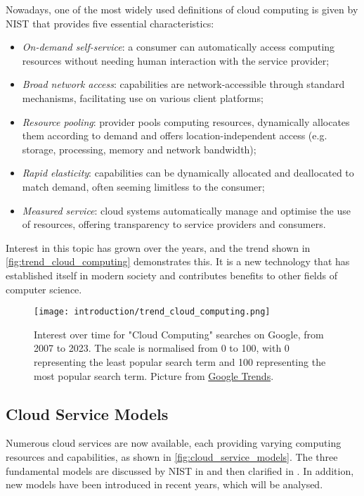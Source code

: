 \documentclass[../thesis.tex]{subfiles}
\begin{document}
Nowadays, one of the most widely used definitions of cloud computing is given by \acrshort{NIST} \cite{article:nist_cloud_computing_2011} that provides five essential characteristics:
\begin{itemize}
    \item \textit{On-demand self-service}: a consumer can automatically access computing resources without needing human interaction with the service provider;
    \item \textit{Broad network access}: capabilities are network-accessible through standard mechanisms, facilitating use on various client platforms;
    \item \textit{Resource pooling}: provider pools computing resources, dynamically allocates them according to demand and offers location-independent access (e.g. storage, processing, memory and network bandwidth);
    \item \textit{Rapid elasticity}: capabilities can be dynamically allocated and deallocated to match demand, often seeming limitless to the consumer;
    \item \textit{Measured service}: cloud systems automatically manage and optimise the use of resources, offering transparency to service providers and consumers.
\end{itemize}

Interest in this topic has grown over the years, and the trend shown in \autoref{fig:trend_cloud_computing} demonstrates this. It is a new technology that has established itself in modern society and contributes benefits to other fields of computer science.


\begin{figure}[H]
    \centering
    \texttt{[image: introduction/trend\_cloud\_computing.png]}
    \caption[Interest over time for "Cloud Computing" searches on Google]{Interest over time for "Cloud Computing" searches on Google, from 2007 to 2023. The scale is normalised from 0 to 100, with 0 representing the least popular search term and 100 representing the most popular search term. Picture from \href{https://www.google.com/trends}{Google Trends}.}
    \label{fig:trend_cloud_computing}
\end{figure}

\subsection{Cloud Service Models}
Numerous cloud services are now available, each providing varying computing resources and capabilities, as shown in \autoref{fig:cloud_service_models}. The three fundamental models are discussed by \acrshort{NIST} in \cite{article:nist_cloud_computing_2011} and then clarified in \cite{article:nist_services_evaluation_2018}. In addition, new models have been introduced in recent years, which will be analysed.
\end{document}
